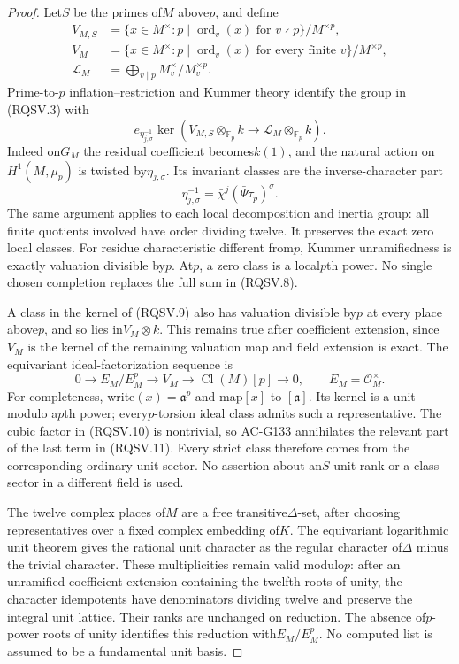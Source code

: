 \begin{proof}
Let$S$ be the primes of$M$ above$p$, and define
\[
 \begin{split}
 V_{M,S}&=\{x\in M^\times:
       p\mid\operatorname{ord}_v(x)\text{ for }v\nmid p\}/M^{\times p},\\
 V_M&=\{x\in M^\times:
       p\mid\operatorname{ord}_v(x)\text{ for every finite }v\}/M^{\times p},\\
 \mathcal L_M&=\bigoplus_{v\mid p}M_v^\times/M_v^{\times p}.
 \end{split}
 \tag{RQSV.8}
\]
Prime-to-$p$ inflation--restriction and Kummer theory identify
the group in (RQSV.3) with
\[
 e_{\eta_{j,\sigma}^{-1}}\ker\left(
           V_{M,S}\otimes_{\mathbb F_p}k
             \longrightarrow\mathcal L_M\otimes_{\mathbb F_p}k
                            \right).
 \tag{RQSV.9}
\]
Indeed on$G_M$ the residual coefficient becomes$k(1)$, and the
natural action on$H^1(M,\mu_p)$ is twisted by$\eta_{j,\sigma}$.
Its invariant classes are the inverse-character part
\[
                \eta_{j,\sigma}^{-1}
                  =\bar\chi^j(\bar\Psi\tau_p)^\sigma.
 \tag{RQSV.10}
\]
The same argument applies to each local decomposition and inertia
group: all finite quotients involved have order dividing twelve.
It preserves the exact zero local classes.  For residue
characteristic different from$p$, Kummer unramifiedness is exactly
valuation divisible by$p$.  At$p$, a zero class is a local$p$th
power.  No single chosen completion replaces the full sum in
(RQSV.8).

A class in the kernel of (RQSV.9) also has valuation divisible
by$p$ at every place above$p$, and so lies in$V_M\otimes k$.
This remains true after coefficient extension, since$V_M$ is
the kernel of the remaining valuation map and field extension
is exact.  The equivariant ideal-factorization sequence is
\[
 0\longrightarrow E_M/E_M^p\longrightarrow V_M
   \longrightarrow\operatorname{Cl}(M)[p]\longrightarrow0,
 \qquad E_M=\mathcal O_M^\times .
 \tag{RQSV.11}
\]
For completeness, write$(x)=\mathfrak a^p$ and map$[x]$ to
$[\mathfrak a]$.  Its kernel is a unit modulo a$p$th power;
every$p$-torsion ideal class admits such a representative.
The cubic factor in (RQSV.10) is nontrivial, so AC-G133 annihilates
the relevant part of the last term in (RQSV.11).
Every strict class therefore comes from the corresponding
ordinary unit sector.  No assertion about an$S$-unit rank or a
class sector in a different field is used.

The twelve complex places of$M$ are a free transitive$\Delta$-set,
after choosing representatives over a fixed complex embedding of$K$.
The equivariant logarithmic unit theorem gives the rational unit
character as the regular character of$\Delta$ minus the trivial
character.  These multiplicities remain valid modulo$p$:
after an unramified coefficient extension containing the twelfth
roots of unity, the character idempotents have denominators
dividing twelve and preserve the integral unit lattice.
Their ranks are unchanged on reduction.  The absence of$p$-power
roots of unity identifies this reduction with$E_M/E_M^p$.
No computed list is assumed to be a fundamental unit basis.


\end{proof}
